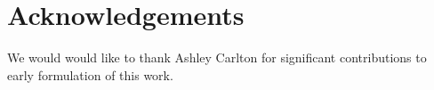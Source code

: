 \documentclass[12pt]{article}
\begin{document}
\section*{Acknowledgements}
We would would like to thank Ashley Carlton for significant contributions to early formulation of this work.









\end{document}
